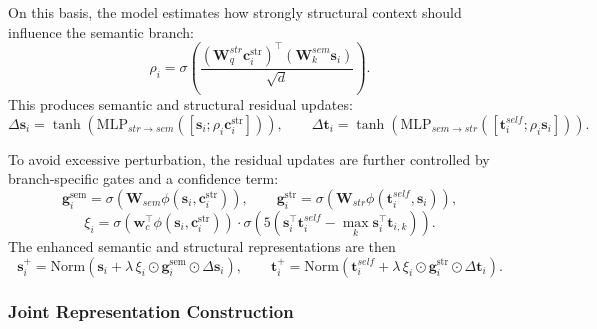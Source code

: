 On this basis, the model estimates how strongly structural context should influence the semantic branch:
\begin{equation}
\rho_i
=
\sigma
\left(
\frac{
(\mathbf{W}_{q}^{str}\mathbf{c}_i^{\mathrm{str}})^{\top}
(\mathbf{W}_{k}^{sem}\mathbf{s}_i)
}{\sqrt{d}}
\right).
\end{equation}
This produces semantic and structural residual updates:
\begin{equation}
\Delta \mathbf{s}_i
=
\tanh
\left(
\mathrm{MLP}_{str\rightarrow sem}
\left(
[\mathbf{s}_i;\rho_i\mathbf{c}_i^{\mathrm{str}}]
\right)
\right),
\qquad
\Delta \mathbf{t}_i
=
\tanh
\left(
\mathrm{MLP}_{sem\rightarrow str}
\left(
[\mathbf{t}_i^{self};\rho_i\mathbf{s}_i]
\right)
\right).
\end{equation}

To avoid excessive perturbation, the residual updates are further controlled by branch-specific gates and a confidence term:
\begin{equation}
\mathbf{g}_i^{\mathrm{sem}}
=
\sigma\!\left(\mathbf{W}_{sem}\phi(\mathbf{s}_i,\mathbf{c}_i^{\mathrm{str}})\right),
\qquad
\mathbf{g}_i^{\mathrm{str}}
=
\sigma\!\left(\mathbf{W}_{str}\phi(\mathbf{t}_i^{self},\mathbf{s}_i)\right),
\end{equation}
\begin{equation}
\xi_i
=
\sigma\!\left(\mathbf{w}_{c}^{\top}\phi(\mathbf{s}_i,\mathbf{c}_i^{\mathrm{str}})\right)
\cdot
\sigma\!\left(
5\left(
\mathbf{s}_i^{\top}\mathbf{t}_i^{self}
-
\max_k \mathbf{s}_i^{\top}\mathbf{t}_{i,k}
\right)
\right).
\end{equation}
The enhanced semantic and structural representations are then
\begin{equation}
\mathbf{s}_i^{+}
=
\mathrm{Norm}
\left(
\mathbf{s}_i
+
\lambda\,\xi_i\odot\mathbf{g}_i^{\mathrm{sem}}\odot\Delta\mathbf{s}_i
\right),
\qquad
\mathbf{t}_i^{+}
=
\mathrm{Norm}
\left(
\mathbf{t}_i^{self}
+
\lambda\,\xi_i\odot\mathbf{g}_i^{\mathrm{str}}\odot\Delta\mathbf{t}_i
\right).
\end{equation}

\subsubsection{Joint Representation Construction}

